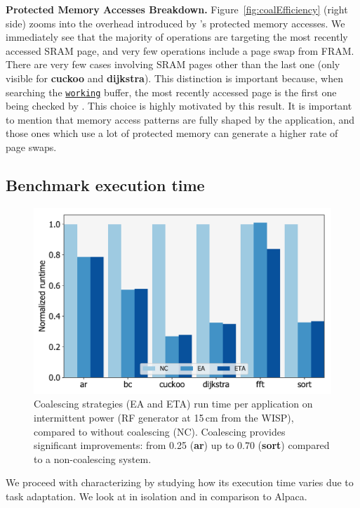 \textbf{Protected Memory Accesses Breakdown.} Figure~\ref{fig:coalEfficiency} (right side) zooms into the overhead introduced by \sys's protected memory accesses.
We immediately see that the majority of operations are targeting the most recently accessed SRAM page, and very few operations include a page swap from FRAM. There are very few cases involving SRAM pages other than the last one (only visible for \textbf{cuckoo} and \textbf{dijkstra}). This distinction is important because, when searching the \texttt{\underline{working}} buffer, the most recently accessed page is the first one being checked by \sys. This choice is highly motivated by this result. It is important to mention that memory access patterns are fully shaped by the application, and those ones which use a lot of protected memory can generate a higher rate of page swaps.

\subsection{Benchmark execution time}
\label{sec:result_coalescing}

\begin{figure}
	\centering
	\includegraphics[width=0.5\columnwidth]{figures/coalStrategies}
	\caption{Coalescing strategies (EA and ETA) run time per application on intermittent power (RF generator at 15\,cm from the WISP), compared to \sys without coalescing (NC). Coalescing provides significant improvements: from 0.25 (\textbf{ar}) up to 0.70 (\textbf{sort}) compared to a non-coalescing system.}
	\label{fig:coalescing}
\end{figure}

We proceed with characterizing \sys by studying how its execution time varies due to task adaptation. We look at \sys in isolation and in comparison to Alpaca.

